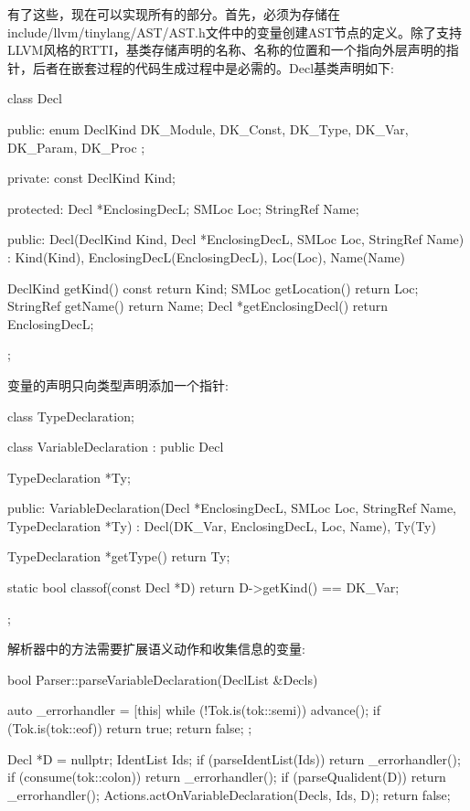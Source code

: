 
有了这些，现在可以实现所有的部分。首先，必须为存储在include/llvm/tinylang/AST/AST.h文件中的变量创建AST节点的定义。除了支持LLVM风格的RTTI，基类存储声明的名称、名称的位置和一个指向外层声明的指针，后者在嵌套过程的代码生成过程中是必需的。Decl基类声明如下:

\begin{cpp}
class Decl {
public:
    enum DeclKind { DK_Module, DK_Const, DK_Type,
                    DK_Var, DK_Param, DK_Proc };

private:
    const DeclKind Kind;

protected:
    Decl *EnclosingDecL;
    SMLoc Loc;
    StringRef Name;

public:
    Decl(DeclKind Kind, Decl *EnclosingDecL, SMLoc Loc,
        StringRef Name)
        : Kind(Kind), EnclosingDecL(EnclosingDecL), Loc(Loc),
        Name(Name) {}

    DeclKind getKind() const { return Kind; }
    SMLoc getLocation() { return Loc; }
    StringRef getName() { return Name; }
    Decl *getEnclosingDecl() { return EnclosingDecL; }
};
\end{cpp}

变量的声明只向类型声明添加一个指针:

\begin{cpp}
class TypeDeclaration;

class VariableDeclaration : public Decl {
    TypeDeclaration *Ty;

public:
    VariableDeclaration(Decl *EnclosingDecL, SMLoc Loc,
                        StringRef Name, TypeDeclaration *Ty)
        : Decl(DK_Var, EnclosingDecL, Loc, Name), Ty(Ty) {}

    TypeDeclaration *getType() { return Ty; }

    static bool classof(const Decl *D) {
        return D->getKind() == DK_Var;
    }
};
\end{cpp}

解析器中的方法需要扩展语义动作和收集信息的变量:

\begin{cpp}
bool Parser::parseVariableDeclaration(DeclList &Decls) {
    auto _errorhandler = [this] {
        while (!Tok.is(tok::semi)) {
            advance();
            if (Tok.is(tok::eof)) return true;
        }
        return false;
    };

    Decl *D = nullptr; IdentList Ids;
    if (parseIdentList(Ids)) return _errorhandler();
    if (consume(tok::colon)) return _errorhandler();
    if (parseQualident(D)) return _errorhandler();
    Actions.actOnVariableDeclaration(Decls, Ids, D);
    return false;
}
\end{cpp}

